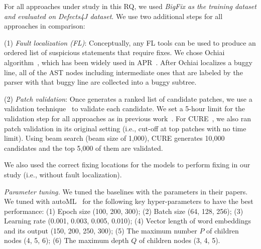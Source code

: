 For all approaches under study in this RQ, we used {\em BigFix as the
training dataset and evaluated on Defects4J dataset}. 
We use two additional steps for all approaches in comparison:

(1) {\em Fault localization (FL)}: Conceptually, any FL
tools can be used to produce an ordered list of suspicious
statements that require fixes. We chose Ochiai
algorithm~\cite{abreu2006evaluation, pearson2017evaluating}, which has
been widely used in
APR~\cite{jiang2018shaping,xiong2017precise,koyuncu2018fixminer,xin2017leveraging,wen2018context,liu2018lsrepair}.
After Ochiai localizes a buggy line, all of the AST nodes including
intermediate ones that are labeled by the parser with that buggy line
are collected into a buggy subtree.

(2) {\em Patch validation}: Once {\tool} generates a ranked list of
candidate patches, we use a validation
technique~\cite{saha2017elixir,jiang2018shaping} to validate each
candidate.
We set a 5-hour limit for the validation step for all approaches as in
previous work~\cite{icse20,tbar-issta19}.
For CURE~\cite{cure-icse21}, we also ran patch validation in its
original setting (i.e., cut-off at top patches with no time
limit). Using beam search (beam size of 1,000), CURE generates 10,000
candidates and the top 5,000 of them are validated.


We also used the correct fixing locations for the models to perform
fixing in our study (i.e., without fault localization).



{\em Parameter tuning.} We tuned the baselines with the
parameters in their papers.
We tuned {\tool} with autoML~\cite{NNI} for the following key
hyper-parameters to have the best performance: (1) Epoch size (100,
200, 300); (2) Batch size (64, 128, 256); (3) Learning rate (0.001,
0.003, 0.005, 0.010); (4) Vector length of word embeddings and its
output (150, 200, 250, 300); (5) The maximum number $P$ of children
nodes (4, 5, 6); (6) The maximum depth $Q$ of children nodes (3, 4,
5).

